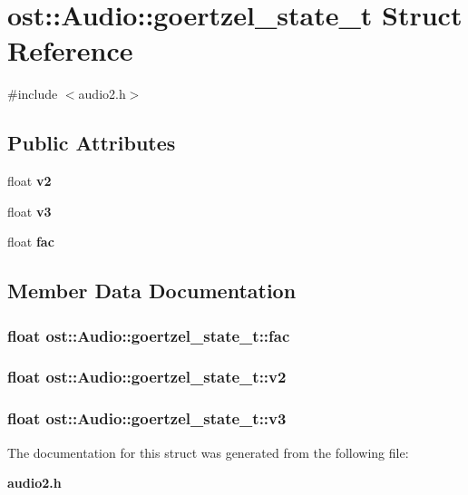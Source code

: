 \section{ost::Audio::goertzel\_\-state\_\-t Struct Reference}
\label{structost_1_1_audio_1_1goertzel__state__t}


{\ttfamily \#include $<$audio2.h$>$}\subsection*{Public Attributes}
\begin{DoxyCompactItemize}
\item 
float {\bf v2}
\item 
float {\bf v3}
\item 
float {\bf fac}
\end{DoxyCompactItemize}


\subsection{Member Data Documentation}
\subsubsection[{fac}]{\setlength{\rightskip}{0pt plus 5cm}float {\bf ost::Audio::goertzel\_\-state\_\-t::fac}}\label{structost_1_1_audio_1_1goertzel__state__t_a1630fc16b30ad926fb0ea8d1b63716a5}
\subsubsection[{v2}]{\setlength{\rightskip}{0pt plus 5cm}float {\bf ost::Audio::goertzel\_\-state\_\-t::v2}}\label{structost_1_1_audio_1_1goertzel__state__t_a1a7405840dfec270e33a47cabcdff91f}
\subsubsection[{v3}]{\setlength{\rightskip}{0pt plus 5cm}float {\bf ost::Audio::goertzel\_\-state\_\-t::v3}}\label{structost_1_1_audio_1_1goertzel__state__t_ab100a79a96a5baeeb2792adf9e5401b0}


The documentation for this struct was generated from the following file:\begin{DoxyCompactItemize}
\item 
{\bf audio2.h}\end{DoxyCompactItemize}
